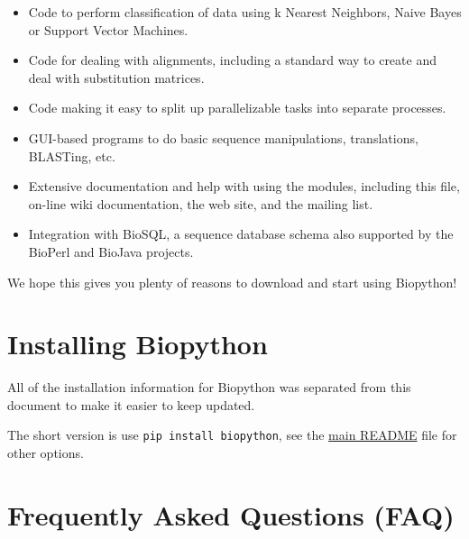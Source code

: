\begin{itemize}
  \item Code to perform classification of data using k Nearest Neighbors, Naive Bayes or Support Vector Machines.

  \item Code for dealing with alignments, including a standard way to create and deal with substitution matrices.

  \item Code making it easy to split up parallelizable tasks into separate processes.

  \item GUI-based programs to do basic sequence manipulations, translations, BLASTing, etc.

  \item Extensive documentation and help with using the modules, including this file, on-line wiki documentation, the web site, and the mailing list.

  \item Integration with BioSQL, a sequence database schema also supported by the BioPerl and BioJava projects.

\end{itemize}

We hope this gives you plenty of reasons to download and start using Biopython!

\section{Installing Biopython}

All of the installation information for Biopython was separated from
this document to make it easier to keep updated.

The short version is use \verb|pip install biopython|, see the
\href{https://github.com/biopython/biopython/blob/master/README.rst}{main README}
file for other options.

\section{Frequently Asked Questions (FAQ)}

